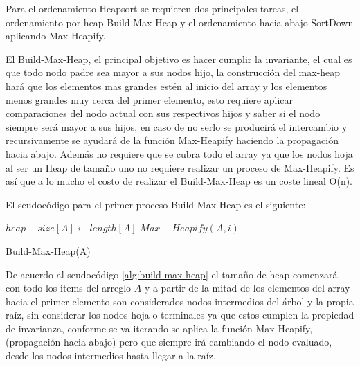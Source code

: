 \documentclass{article}
\begin{document}
    		        Para el ordenamiento Heapsort se requieren dos principales tareas, el ordenamiento por heap Build-Max-Heap y el ordenamiento hacia abajo SortDown aplicando Max-Heapify.
    		            
    		        El Build-Max-Heap, el principal objetivo es hacer cumplir la invariante, el cual es que todo nodo padre sea mayor a sus nodos hijo, la construcci\'{o}n del max-heap har\'{a} que los elementos mas grandes estén al inicio del array y los elementos menos grandes muy cerca del primer elemento, esto requiere aplicar comparaciones del nodo actual con sus respectivos hijos y saber si el nodo siempre ser\'{a} mayor a sus hijos, en caso de no serlo se producir\'{a} el intercambio y recursivamente se ayudar\'{a} de la funci\'{o}n Max-Heapify haciendo la propagaci\'{o}n hacia abajo. Adem\'{a}s no requiere que se cubra todo el array ya que los nodos hoja al ser un Heap de tama\~{n}o uno no requiere realizar un proceso de Max-Heapify. Es as\'{i} que a lo mucho el costo de realizar el Build-Max-Heap es un coste lineal O(n).
    		            
    		        El seudoc\'{o}digo para el primer proceso Build-Max-Heap es el siguiente:
    		            
    		        \begin{algorithm}[H]
                        \begin{algorithmic}[1]
                            \STATE $heap-size[A] \leftarrow length[A]$
                                \STATE $Max-Heapify(A,i)$
                            \ENDFOR
                        \end{algorithmic}
                        \caption{Build-Max-Heap(A)}
                        \label{alg:build-max-heap}
                    \end{algorithm}
                        
                    De acuerdo al seudoc\'{o}digo \ref{alg:build-max-heap} el tamaño de heap comenzar\'{a} con todo los items del arreglo $A$ y a partir de la mitad de los elementos del array hacia el primer elemento son considerados nodos intermedios del \'{a}rbol y la propia ra\'{i}z, sin considerar los nodos hoja o terminales ya que estos cumplen la propiedad de invarianza, conforme se va iterando se aplica la funci\'{o}n Max-Heapify, (propagaci\'{o}n hacia abajo) pero que siempre ir\'{a} cambiando el nodo evaluado, desde los nodos intermedios hasta llegar a la ra\'{i}z.
                        
\end{document}
